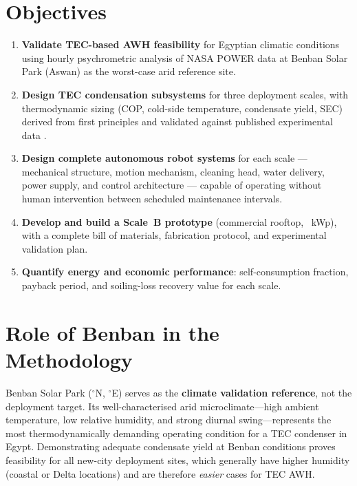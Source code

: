 \documentclass[11pt,a4paper]{article}
\begin{document}
\section{Objectives}

\begin{enumerate}[leftmargin=*]
  \item \textbf{Validate TEC-based AWH feasibility} for Egyptian climatic conditions using
  hourly psychrometric analysis of NASA POWER data at Benban Solar Park (Aswan) as the
  worst-case arid reference site.
  \item \textbf{Design TEC condensation subsystems} for three deployment scales, with
  thermodynamic sizing (COP, cold-side temperature, condensate yield, SEC) derived from first
  principles and validated against published experimental data
  \cite{eslami2021tec,shourideh2021tec,alqaed2023awg}.
  \item \textbf{Design complete autonomous robot systems} for each scale --- mechanical structure,
  motion mechanism, cleaning head, water delivery, power supply, and control architecture ---
  capable of operating without human intervention between scheduled maintenance intervals.
  \item \textbf{Develop and build a Scale~B prototype} (commercial rooftop, \ScaleBPV~kWp),
  with a complete bill of materials, fabrication protocol, and experimental validation plan.
  \item \textbf{Quantify energy and economic performance}: self-consumption fraction,
  payback period, and soiling-loss recovery value for each scale.
\end{enumerate}

\section{Role of Benban in the Methodology}

Benban Solar Park (\BenbanLat$^\circ$N, \BenbanLon$^\circ$E) serves as the \textbf{climate
validation reference}, not the deployment target. Its well-characterised arid
microclimate---high ambient temperature, low relative humidity, and strong diurnal
swing---represents the most thermodynamically demanding operating condition for a TEC condenser
in Egypt. Demonstrating adequate condensate yield at Benban conditions proves feasibility for
all new-city deployment sites, which generally have higher humidity (coastal or Delta locations)
and are therefore \emph{easier} cases for TEC AWH.
\end{document}
